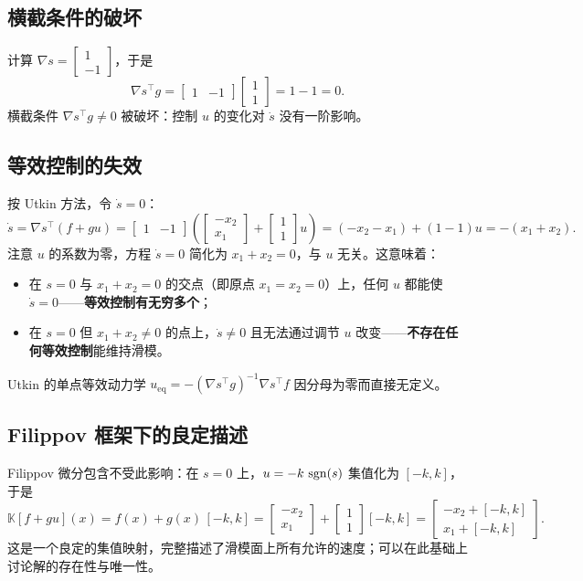 \subsection{横截条件的破坏}

计算 $\nabla s = \begin{bmatrix} 1 \\ -1 \end{bmatrix}$，于是
\[
\nabla s^\top g = \begin{bmatrix} 1 & -1 \end{bmatrix} \begin{bmatrix} 1 \\ 1 \end{bmatrix} = 1 - 1 = 0.
\]
横截条件 $\nabla s^\top g\neq0$ 被破坏：控制 $u$ 的变化对 $\dot s$ 没有一阶影响。

\subsection{等效控制的失效}

按 Utkin 方法，令 $\dot s=0$：
\[
\dot s = \nabla s^\top (f + g u) = \begin{bmatrix} 1 & -1 \end{bmatrix} \left( \begin{bmatrix} -x_2 \\ x_1 \end{bmatrix} + \begin{bmatrix} 1 \\ 1 \end{bmatrix} u \right)
       = (-x_2 - x_1) + (1 - 1) u
       = -(x_1 + x_2).
\]
注意 $u$ 的系数为零，方程 $\dot s=0$ 简化为 $x_1+x_2=0$，与 $u$ 无关。这意味着：
\begin{itemize}
  \item 在 $s=0$ 与 $x_1+x_2=0$ 的交点（即原点 $x_1=x_2=0$）上，任何 $u$ 都能使 $\dot s=0$——\textbf{等效控制有无穷多个}；
  \item 在 $s=0$ 但 $x_1+x_2\neq0$ 的点上，$\dot s\neq0$ 且无法通过调节 $u$ 改变——\textbf{不存在任何等效控制}能维持滑模。
\end{itemize}
Utkin 的单点等效动力学 $u_\mathrm{eq} = -(\nabla s^\top g)^{-1}\nabla s^\top f$ 因分母为零而直接无定义。

\subsection{Filippov 框架下的良定描述}

Filippov 微分包含不受此影响：在 $s=0$ 上，$u=-k\,\operatorname{sgn}(s)$ 集值化为 $[-k,k]$，于是
\[
\mathbb{K}[f+gu](x) = f(x) + g(x)\,[-k,k]
                    = \begin{bmatrix} -x_2 \\ x_1 \end{bmatrix} + \begin{bmatrix} 1 \\ 1 \end{bmatrix} [-k,k]
                    = \begin{bmatrix} -x_2 + [-k,k] \\ x_1 + [-k,k] \end{bmatrix}.
\]
这是一个良定的集值映射，完整描述了滑模面上所有允许的速度；可以在此基础上讨论解的存在性与唯一性。

